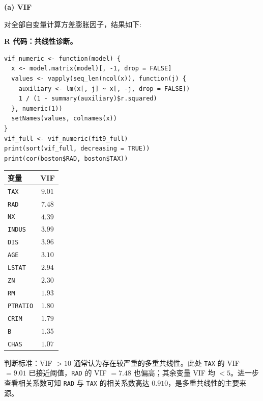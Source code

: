 \documentclass[12pt,a4paper]{article}
\begin{document}
\begin{answerbox}

\textbf{(a) VIF }\quad

对全部自变量计算方差膨胀因子，结果如下:

\textbf{R 代码：共线性诊断。}
\begin{lstlisting}[style=rcode]
vif_numeric <- function(model) {
  x <- model.matrix(model)[, -1, drop = FALSE]
  values <- vapply(seq_len(ncol(x)), function(j) {
    auxiliary <- lm(x[, j] ~ x[, -j, drop = FALSE])
    1 / (1 - summary(auxiliary)$r.squared)
  }, numeric(1))
  setNames(values, colnames(x))
}
vif_full <- vif_numeric(fit9_full)
print(sort(vif_full, decreasing = TRUE))
print(cor(boston$RAD, boston$TAX))
\end{lstlisting}

\begin{center}
\small
\begin{tabular}{lc}
\toprule
变量 & VIF \\
\midrule
\texttt{TAX}     & $9.01$ \\
\texttt{RAD}     & $7.48$ \\
\texttt{NX}      & $4.39$ \\
\texttt{INDUS}   & $3.99$ \\
\texttt{DIS}     & $3.96$ \\
\texttt{AGE}     & $3.10$ \\
\texttt{LSTAT}   & $2.94$ \\
\texttt{ZN}      & $2.30$ \\
\texttt{RM}      & $1.93$ \\
\texttt{PTRATIO} & $1.80$ \\
\texttt{CRIM}    & $1.79$ \\
\texttt{B}       & $1.35$ \\
\texttt{CHAS}    & $1.07$ \\
\bottomrule
\end{tabular}
\end{center}

判断标准：VIF $>10$ 通常认为存在较严重的多重共线性。此处 \texttt{TAX} 的 VIF $=9.01$ 已接近阈值，\texttt{RAD} 的 VIF $=7.48$ 也偏高；其余变量 VIF 均 $<5$。进一步查看相关系数可知 \texttt{RAD} 与 \texttt{TAX} 的相关系数高达 $0.910$，是多重共线性的主要来源。



\end{answerbox}
\end{document}
